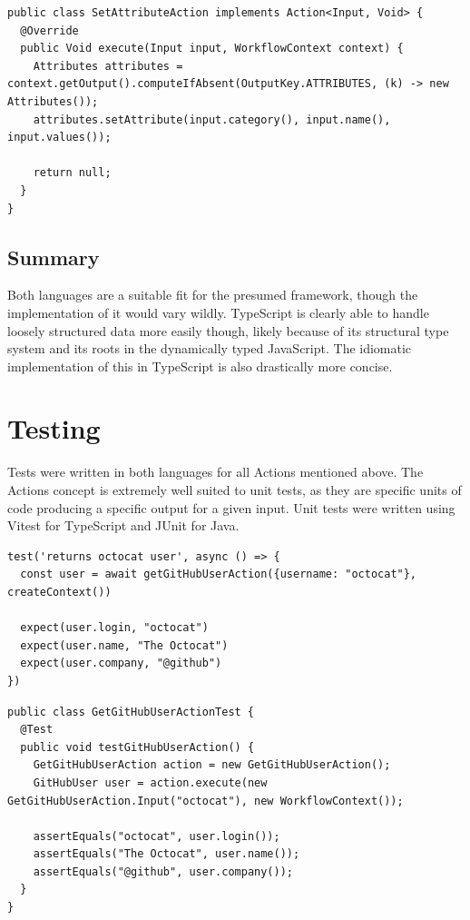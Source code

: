 \begin{listing}[H]
\begin{verbatim}
public class SetAttributeAction implements Action<Input, Void> {
  @Override
  public Void execute(Input input, WorkflowContext context) {
    Attributes attributes = context.getOutput().computeIfAbsent(OutputKey.ATTRIBUTES, (k) -> new Attributes());
    attributes.setAttribute(input.category(), input.name(), input.values());

    return null;
  }
}
\end{verbatim}
\caption{''Set attribute'' Action in Java}
\end{listing}

\subsection{Summary}
Both languages are a suitable fit for the presumed framework, though the implementation of it would vary wildly. TypeScript is clearly able to handle loosely structured data more easily though, likely because of its structural type system and its roots in the dynamically typed JavaScript. The idiomatic implementation of this in TypeScript is also drastically more concise.

\pagebreak
\section{Testing}
Tests were written in both languages for all Actions mentioned above. The Actions concept is extremely well suited to unit tests, as they are specific units of code producing a specific output for a given input. Unit tests were written using Vitest for TypeScript and JUnit for Java.

\begin{listing}[H]
\begin{verbatim}
test('returns octocat user', async () => {
  const user = await getGitHubUserAction({username: "octocat"}, createContext())
  
  expect(user.login, "octocat")
  expect(user.name, "The Octocat")
  expect(user.company, "@github")
})
\end{verbatim}
\caption{GitHub API Action test in TypeScript}
\end{listing}

\begin{listing}[H]
\begin{verbatim}
public class GetGitHubUserActionTest {
  @Test
  public void testGitHubUserAction() {
    GetGitHubUserAction action = new GetGitHubUserAction();
    GitHubUser user = action.execute(new GetGitHubUserAction.Input("octocat"), new WorkflowContext());

    assertEquals("octocat", user.login());
    assertEquals("The Octocat", user.name());
    assertEquals("@github", user.company());
  }
}
\end{verbatim}
\caption{GitHub API Action test in Java}
\end{listing}

